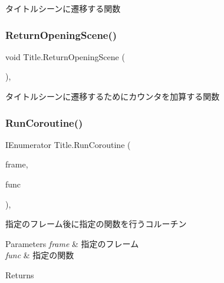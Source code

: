 タイトルシーンに遷移する関数 

\mbox{\label{class_title_a6d366ededddff41323515352d058b24a}} 
\subsubsection{\texorpdfstring{Return\+Opening\+Scene()}{ReturnOpeningScene()}}
{\footnotesize\ttfamily void Title.\+Return\+Opening\+Scene (\begin{DoxyParamCaption}{ }\end{DoxyParamCaption})\hspace{0.3cm}{\ttfamily [inline]}, {\ttfamily [private]}}



タイトルシーンに遷移するためにカウンタを加算する関数 

\mbox{\label{class_title_aa13451685d7894235cd8fa7ff8a3c139}} 
\subsubsection{\texorpdfstring{Run\+Coroutine()}{RunCoroutine()}}
{\footnotesize\ttfamily I\+Enumerator Title.\+Run\+Coroutine (\begin{DoxyParamCaption}\item[{int}]{frame,  }\item[{routine\+Func}]{func }\end{DoxyParamCaption})\hspace{0.3cm}{\ttfamily [inline]}, {\ttfamily [private]}}



指定のフレーム後に指定の関数を行うコルーチン 


\begin{DoxyParams}{Parameters}
{\em frame} & 指定のフレーム\\
\hline
{\em func} & 指定の関数\\
\hline
\end{DoxyParams}
\begin{DoxyReturn}{Returns}

\end{DoxyReturn}
\mbox{\label{class_title_a7b7aeb60856a00d9b0bb201bed2bc878}} 
